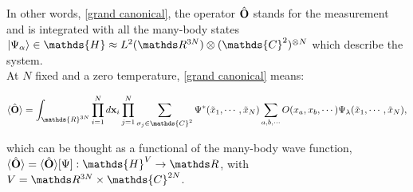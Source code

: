 \documentclass{homework}
\begin{document}
In other words, \eqref{grand canonical}, the operator $\hat{\bf O}$ stands for the measurement and is integrated with all the many-body states $\ket{\Psi_\alpha} \in \mathds{H} \approx L^2(\R^{3N}) \otimes (\mathds{C}^{2})^{\otimes N}$ which describe the system. \\

At $N$ fixed and a zero temperature, \eqref{grand canonical} means:

\begin{equation}
     \langle \hat{\bf O} \rangle = \int_{\mathds{R}^{3N}} \prod_{i=1}^N d{\bf x}_i \prod_{j=1}^{N} \sum_{\sigma_j \in \mathds{C}^2} \Psi^{*}(\tilde{x}_1, \cdots, \tilde{x}_N) \sum_{a,b,\cdots} O(x_a, x_b, \cdots) \Psi_\lambda(\tilde{x}_1, \cdots, \tilde{x}_N),
\end{equation}

which can be thought as a functional of the many-body wave function, $\langle \hat{\bf O} \rangle = \langle \hat{\bf O} \rangle[\Psi]: \mathds{H}^{V} \rightarrow \R$, with $V = \R^{3N} \times \mathds {C}^{2N}$.
\end{document}
